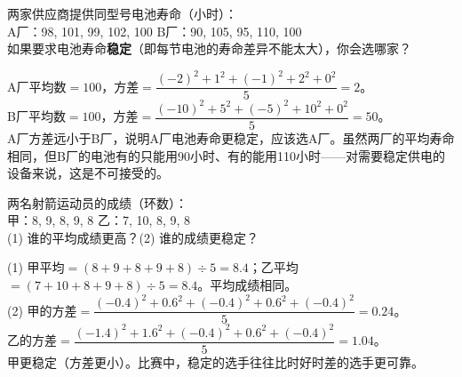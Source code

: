 \begin{example}
两家供应商提供同型号电池寿命（小时）：\\
A厂：98, 101, 99, 102, 100 \qquad B厂：90, 105, 95, 110, 100\\
如果要求电池寿命\textbf{稳定}（即每节电池的寿命差异不能太大），你会选哪家？
\end{example}
\begin{solution}
A厂平均数$=100$，方差$=\dfrac{(-2)^2+1^2+(-1)^2+2^2+0^2}{5}=2$。\\
B厂平均数$=100$，方差$=\dfrac{(-10)^2+5^2+(-5)^2+10^2+0^2}{5}=50$。\\
A厂方差远小于B厂，说明A厂电池寿命更稳定，应该选A厂。虽然两厂的平均寿命相同，但B厂的电池有的只能用90小时、有的能用110小时——对需要稳定供电的设备来说，这是不可接受的。
\end{solution}

\begin{example}
两名射箭运动员的成绩（环数）：\\
甲：8, 9, 8, 9, 8 \qquad 乙：7, 10, 8, 9, 8\\
(1) 谁的平均成绩更高？(2) 谁的成绩更稳定？
\end{example}
\begin{solution}
(1) 甲平均$=(8+9+8+9+8)\div5=8.4$；乙平均$=(7+10+8+9+8)\div5=8.4$。平均成绩相同。\\
(2) 甲的方差$=\dfrac{(-0.4)^2+0.6^2+(-0.4)^2+0.6^2+(-0.4)^2}{5}=0.24$。\\
乙的方差$=\dfrac{(-1.4)^2+1.6^2+(-0.4)^2+0.6^2+(-0.4)^2}{5}=1.04$。\\
甲更稳定（方差更小）。比赛中，稳定的选手往往比时好时差的选手更可靠。
\end{solution}

\begin{center}
\end{center}

